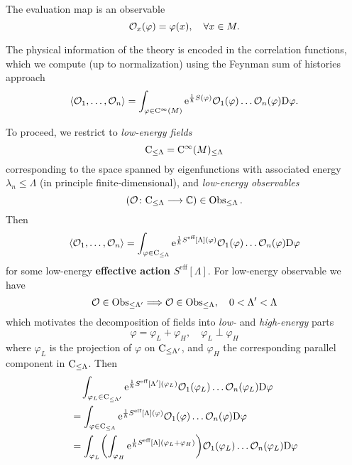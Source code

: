 \begin{example}
  The evaluation map is an observable
  \begin{equation*}
    \mathcal{O}_x (\varphi) = \varphi(x), \quad \forall x \in M.
  \end{equation*}
\end{example}

The physical information of the theory is encoded in the correlation functions, which we compute (up to normalization) using the Feynman sum of histories approach
\begin{equation*}
  \langle \mathcal{O}_1, \dots, \mathcal{O}_n \rangle
  = \int_{\varphi \in \mathrm{C}^\infty(M)} \mathrm{e}^{\frac{1}{\hbar} S(\varphi) }
  \mathcal{O}_1(\varphi) \dots \mathcal{O}_n(\varphi) \mathrm{D} \varphi.
\end{equation*}

To proceed, we restrict to \textit{low-energy fields}
\begin{equation*}
  \mathrm{C}_{\leq \Lambda} = \mathrm{C}^\infty(M)_{\leq \Lambda}
\end{equation*}
corresponding to the space spanned by eigenfunctions with associated energy $\lambda_n \leq \Lambda$ (in principle finite-dimensional), and \textit{low-energy observables}
\begin{equation*}
  (\mathcal{O} \colon \mathrm{C}_{\leq \Lambda} \longrightarrow \mathbb{C}) \in \operatorname{Obs}_{\leq \Lambda}.
\end{equation*}
Then
\begin{equation*}
  \langle \mathcal{O}_1, \dots, \mathcal{O}_n \rangle
  = \int_{\varphi \in \mathrm{C}_{\leq \Lambda}}
  \mathrm{e}^{\frac{1}{\hbar} S^\text{eff}[\Lambda](\varphi)} \mathcal{O}_1 (\varphi) \dots \mathcal{O}_n (\varphi) \mathrm{D} \varphi
\end{equation*}
for some low-energy \textbf{effective action} $S^\text{eff}[\Lambda]$. For low-energy observable we have
\begin{equation*}
  \mathcal{O} \in \operatorname{Obs}_{\leq \Lambda'} \Longrightarrow
  \mathcal{O} \in \operatorname{Obs}_{\leq \Lambda}, \quad 0 < \Lambda' < \Lambda
\end{equation*}
which motivates the decomposition of fields into \textit{low-} and \textit{high-energy} parts
\begin{equation*}
  \varphi = \varphi_L + \varphi_H, \quad \varphi_L \perp \varphi_H
\end{equation*}
where $\varphi_L$ is the projection of $\varphi$ on $\mathrm{C}_{\leq \Lambda'}$, and $\varphi_H$ the corresponding parallel component in $\mathrm{C}_{\leq \Lambda}$. Then
\begin{align*}
  &\quad \int_{\varphi_L \in \mathrm{C}_{\leq \Lambda'}} \mathrm{e}^{\frac{1}{\hbar} S^\text{eff} [\Lambda'] (\varphi_L)}
    \mathcal{O}_1 (\varphi_L) \dots \mathcal{O}_n (\varphi_L) \mathrm{D} \varphi \\
  &= \int_{\varphi \in \mathrm{C}_{\leq \Lambda}} \mathrm{e}^{\frac{1}{\hbar} S^\text{eff}[\Lambda](\varphi)}
    \mathcal{O}_1 (\varphi) \dots \mathcal{O}_n(\varphi) \mathrm{D} \varphi \\
  &= \int_{\varphi_L} 
  \biggl(\int_{\varphi_H} \mathrm{e}^{\frac{1}{\hbar} S^\text{eff}[\Lambda] (\varphi_L+\varphi_H)}\biggr)
  \mathcal{O}_1(\varphi_L) \dots \mathcal{O}_n (\varphi_L) \mathrm{D} \varphi
\end{align*}

